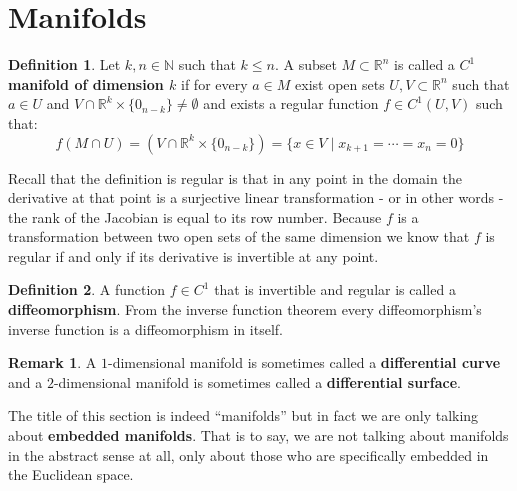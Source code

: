 \documentclass[11pt,a4paper]{article}
\theoremstyle{definition}
\newtheorem{definition}{Definition}[section]
\newtheorem{remark}{Remark}[section]
\theoremstyle{plain}
\newcommand{\N}{\mathbb{N}}
\newcommand{\R}{\mathbb{R}}
\begin{document}
	\section{Manifolds}
	\begin{definition}
		Let $k,n \in \N$ such that $k \le n$. A subset $M \subset \R^n$
		is called a \textbf{$C^1$ manifold of dimension \textbf{$k$}}
		if for every $a \in M$ exist open sets $U,V \subset \R^n$ such that
		$a \in U$ and $V \cap \R^k \times \{0_{n-k}\} \neq \emptyset$ and 
		exists a regular function $f \in C^1(U,V)$ such that:
		\[
			f(M \cap U) = (V \cap \R^k \times \{0_{n-k}\}) = 
			\{x \in V \mid x_{k+1} = \cdots = x_n = 0\}
		\]
	\end{definition}
	Recall that the definition is regular is that in any point in the domain
	the derivative at that point is a surjective linear transformation - or
	in other words - the rank of the Jacobian is equal to its row number.
	Because $f$ is a transformation between two open sets of the same
	dimension we know that $f$ is regular if and only if its derivative
	is invertible at any point.
	\begin{definition}
		A function $f \in C^1$ that is invertible and regular is called
		a \textbf{diffeomorphism}. From the inverse function theorem
		every diffeomorphism's inverse function is a diffeomorphism in itself.
	\end{definition}
	\begin{remark}
		A $1$-dimensional manifold is sometimes called a 
		\textbf{differential curve} and a $2$-dimensional manifold is 
		sometimes called a \textbf{differential surface}.
	\end{remark}
	The title of this section is indeed ``manifolds'' but in fact we
	are only talking about \textbf{embedded manifolds}. That is to say,
	we are not talking about manifolds in the abstract sense at all,
	only about those who are specifically embedded in the Euclidean space.
\end{document}
